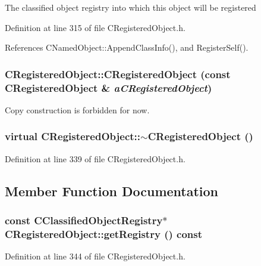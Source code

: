 The classified object  registry into which this  object will be registered 

Definition at line 315 of file CRegistered\-Object.h.

References CNamed\-Object::Append\-Class\-Info(), and Register\-Self().
\subsubsection{\setlength{\rightskip}{0pt plus 5cm}CRegistered\-Object::CRegistered\-Object (const CRegistered\-Object \& {\em a\-CRegistered\-Object})\hspace{0.3cm}{\tt  [private]}}\label{classCRegisteredObject_c0}


Copy construction is forbidden for now.

\subsubsection{\setlength{\rightskip}{0pt plus 5cm}virtual CRegistered\-Object::$\sim$CRegistered\-Object ()\hspace{0.3cm}{\tt  [inline, virtual]}}\label{classCRegisteredObject_a2}




Definition at line 339 of file CRegistered\-Object.h.

\subsection{Member Function Documentation}
\subsubsection{\setlength{\rightskip}{0pt plus 5cm}const {\bf CClassified\-Object\-Registry}$\ast$ CRegistered\-Object::get\-Registry () const\hspace{0.3cm}{\tt  [inline]}}\label{classCRegisteredObject_a3}




Definition at line 344 of file CRegistered\-Object.h.

